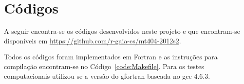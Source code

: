 \documentclass[12pt,a4paper]{article}
\begin{document}
\section{C\'{o}digos}
A seguir encontra-se os c\'{o}digos desenvolvidos neste projeto e que
encontram-se disponíveis em \url{https://github.com/r-gaia-cs/mt404-2012s2}.

Todos os c\'{o}digos foram implementados em Fortran e as instruções para
compilação encontram-se no Código~\ref{code:Makefile}. Para os testes
computacionais utilizou-se a versão do gfortran baseada no gcc 4.6.3.








\end{document}
